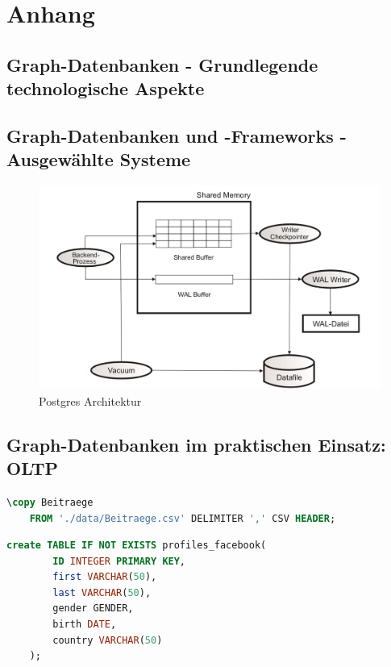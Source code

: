 \appendix
\chapter{Anhang}
\section{Graph-Datenbanken - Grundlegende technologische Aspekte}
\section{Graph-Datenbanken und -Frameworks - Ausgewählte Systeme}
\begin{figure}[H]

    \includegraphics[width = \linewidth]{images/postgresArchitektur.jpg}
    \caption{Postgres Architektur}
    \label{Postgres Architektur}

\end{figure}
\section{Graph-Datenbanken im praktischen Einsatz: OLTP}
\begin{lstlisting}[language=SQL,caption=CSV Input,frame=single, label={copy}]
    \copy Beitraege
    FROM './data/Beitraege.csv' DELIMITER ',' CSV HEADER;
\end{lstlisting}

\begin{lstlisting}[language=SQL,caption=Anlegen der Tabelle facebook-profiles,frame=single, label={facebookProfiles}]
    create TABLE IF NOT EXISTS profiles_facebook(
        ID INTEGER PRIMARY KEY,
        first VARCHAR(50),
        last VARCHAR(50),
        gender GENDER,
        birth DATE,
        country VARCHAR(50)
    );
\end{lstlisting}

